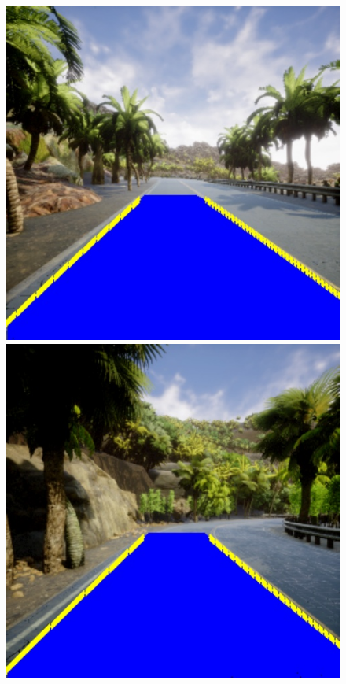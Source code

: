 \begin{figure}[H]
\begin{minipage}[t]{0.2\textwidth}
  \end{minipage}
  \hfill
  \begin{minipage}[t]{0.2\textwidth}
      \centering
      \includegraphics[width=\textwidth]{figs/Diseño/Regresiones/interpolación2.jpg}
  \end{minipage}
  \hfill
  \begin{minipage}[t]{0.2\textwidth}
      \centering
      \includegraphics[width=\textwidth]{figs/Diseño/Regresiones/interpolación3.jpg}

\end{minipage}
\end{figure}
